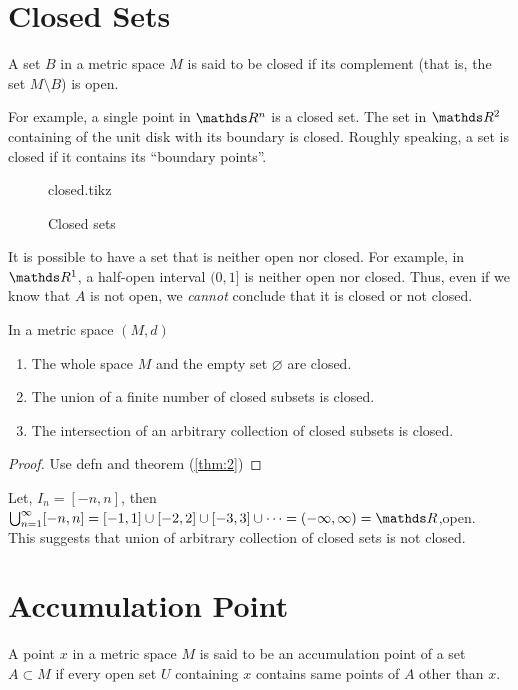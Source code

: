 \documentclass[../main-sheet.tex]{subfiles}
\begin{document}
\section{Closed Sets}
\begin{defn}
    A set $ B $ in a metric space $ M $ is said to be closed if its complement (that is, the set $ M\setminus B $) is open.
\end{defn}

For example, a single point in $ \R^n $ is a closed set. The set in $ \R^2 $ containing of the unit disk with its boundary is closed. Roughly speaking, a set is closed if it contains its ``boundary points''.
\begin{figure}[H]
    \centering
    {closed.tikz}
    \caption{Closed sets}
\end{figure}


It is possible to have a set that is neither open nor closed. For example, in $ \R^1 $, a half-open interval $ (0,1] $ is neither open nor closed. Thus, even if we know that $ A $ is not open, we \emph{cannot} conclude that it is closed or not closed.\newpage
\begin{thm}
    In a metric space $ (M,d) $
    \begin{enumerate}[label=(\roman*)]
        \item The whole space $ M $ and the empty set $ \varnothing $ are closed.
        \item The union of a finite number of closed subsets is closed.
        \item The intersection of an arbitrary collection of closed subsets is closed.
    \end{enumerate}
\end{thm}
\begin{proof}
    Use defn and theorem (\ref{thm:2})
\end{proof}
\begin{note}
    Let, $ I_n=[-n,n] $, then $ \bigcup_{n=1}^\infty[-n,n]=[-1,1]\cup [-2,2]\cup[-3,3]\cup \dots = (-\infty,\infty)=\R$,open.\\ This suggests that union of arbitrary collection of closed sets is not closed.
\end{note}
\section{Accumulation Point}
\begin{defn}
    A point $ x  $ in a metric space $ M $ is said to be an accumulation point of a set $ A\subset M $ if every open set $ U $ containing $ x $ contains same points of $ A $ other than $ x $.
\end{defn}
\end{document}
